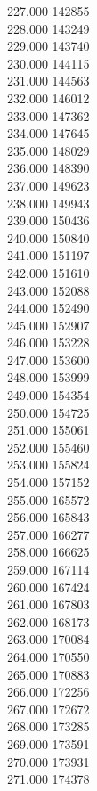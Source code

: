 { 227.000	142855 \\
 228.000	143249 \\
 229.000	143740 \\
 230.000	144115 \\
 231.000	144563 \\
 232.000	146012 \\
 233.000	147362 \\
 234.000	147645 \\
 235.000	148029 \\
 236.000	148390 \\
 237.000	149623 \\
 238.000	149943 \\
 239.000	150436 \\
 240.000	150840 \\
 241.000	151197 \\
 242.000	151610 \\
 243.000	152088 \\
 244.000	152490 \\
 245.000	152907 \\
 246.000	153228 \\
 247.000	153600 \\
 248.000	153999 \\
 249.000	154354 \\
 250.000	154725 \\
 251.000	155061 \\
 252.000	155460 \\
 253.000	155824 \\
 254.000	157152 \\
 255.000	165572 \\
 256.000	165843 \\
 257.000	166277 \\
 258.000	166625 \\
 259.000	167114 \\
 260.000	167424 \\
 261.000	167803 \\
 262.000	168173 \\
 263.000	170084 \\
 264.000	170550 \\
 265.000	170883 \\
 266.000	172256 \\
 267.000	172672 \\
 268.000	173285 \\
 269.000	173591 \\
 270.000	173931 \\
 271.000	174378 \\
}
